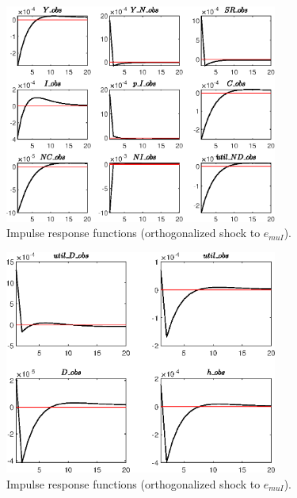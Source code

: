 \begin{figure}[H]
\centering 
\includegraphics[width=0.80\textwidth]{BRS_sectoral/graphs/BRS_sectoral_IRF_e_muI1}
\caption{Impulse response functions (orthogonalized shock to ${e_{muI}}$).}\label{Fig:IRF:e_muI:1}
\end{figure}
 
\begin{figure}[H]
\centering 
\includegraphics[width=0.80\textwidth]{BRS_sectoral/graphs/BRS_sectoral_IRF_e_muI2}
\caption{Impulse response functions (orthogonalized shock to ${e_{muI}}$).}\label{Fig:IRF:e_muI:2}
\end{figure}
 
 
